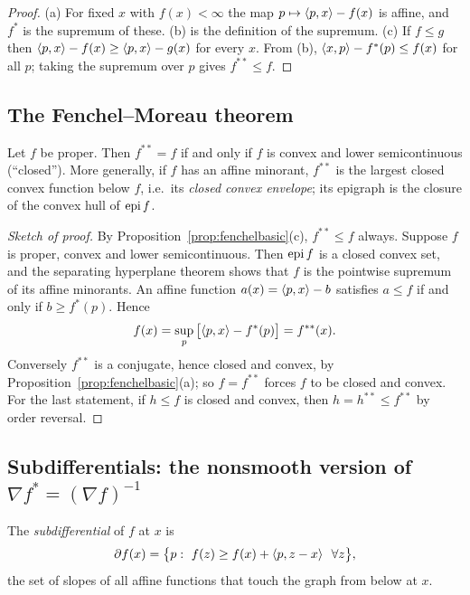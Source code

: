 \begin{proof}
(a) For fixed $x$ with $f(x)<\infty$ the map $p\mapsto\langle p,x\rangle-f(x)$ is affine,
and $f^*$ is the supremum of these.  (b) is the definition of the supremum.
(c) If $f\le g$ then $\langle p,x\rangle-f(x)\ge\langle p,x\rangle-g(x)$ for every $x$.  From (b),
$\langle x,p\rangle-f^*(p)\le f(x)$ for all $p$; taking the supremum over $p$ gives
$f^{**}\le f$.
\end{proof}

\subsection{The Fenchel--Moreau theorem}

\begin{theorem}\label{thm:fm}
Let $f$ be proper. Then $f^{**}=f$ if and only if $f$ is convex and lower
semicontinuous (``closed'').  More generally, if $f$ has an affine minorant,
$f^{**}$ is the largest closed convex function below $f$, i.e.\ its
\emph{closed convex envelope}; its epigraph is the closure of the convex hull
of $\operatorname{epi} f$.
\end{theorem}

\begin{proof}[Sketch of proof]
By Proposition~\ref{prop:fenchelbasic}(c), $f^{**}\le f$ always.  Suppose $f$
is proper, convex and lower semicontinuous.  Then $\operatorname{epi} f$ is a closed convex
set, and the separating hyperplane theorem shows that $f$ is the pointwise
supremum of its affine minorants.  An affine function
$a(x)=\langle p,x\rangle-b$ satisfies $a\le f$ if and only if $b\ge f^*(p)$.  Hence
\[
  f(x)=\sup_{p}\,\bigl[\langle p,x\rangle-f^*(p)\bigr]=f^{**}(x).
\]
Conversely $f^{**}$ is a conjugate, hence closed and convex, by
Proposition~\ref{prop:fenchelbasic}(a); so $f=f^{**}$ forces $f$ to be closed
and convex.  For the last statement, if $h\le f$ is closed and convex, then
$h=h^{**}\le f^{**}$ by order reversal.
\end{proof}

\subsection{Subdifferentials: the nonsmooth version of \texorpdfstring{$\nabla f^*=(\nabla f)^{-1}$}{grad f* is the inverse of grad f}}

The \emph{subdifferential} of $f$ at $x$ is
\[
  \partial f(x)=\bigl\{p:\ f(z)\ge f(x)+\langle p,z-x\rangle\ \ \forall z\bigr\},
\]
the set of slopes of all affine functions that touch the graph from below at
$x$.

